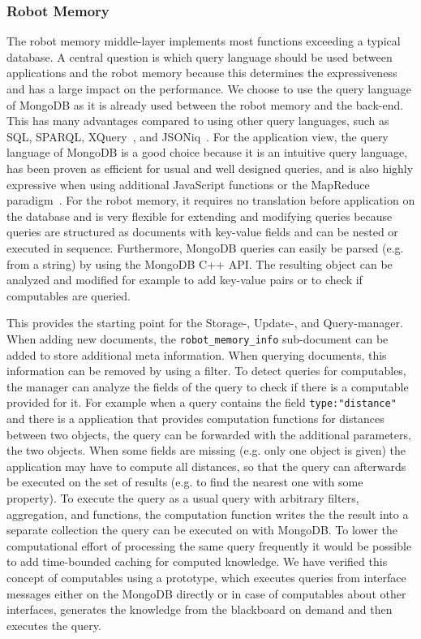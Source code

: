 \documentclass[a4paper,11pt]{article}
\begin{document}
\subsubsection{Robot Memory}
\label{sec:impl-memory}
The robot memory middle-layer implements most functions exceeding a
typical database.
A central question is which query language should be used between
applications and the robot memory because this determines the
expressiveness and has a large impact on the performance. We choose to
use the query language of MongoDB as it is already used between the
robot memory and the back-end. This has many advantages compared to
using other query languages, such as SQL, SPARQL,
XQuery~\cite{query-languages}, and JSONiq~\cite{jsoniq}.
%
For the application view, the query language of MongoDB is a good
choice because it is an intuitive query language, has been proven as
efficient for usual and well designed queries, and is also highly
expressive when using additional JavaScript functions or the MapReduce
paradigm~\cite{mongodb,RoboDB}. For the robot memory, it requires no
translation before application on the database and is very flexible
for extending and modifying queries because queries are structured as
documents with key-value fields and can be nested or executed in
sequence. Furthermore, MongoDB queries can easily be parsed (e.g. from
a string) by using the MongoDB C++ API. The resulting object can be
analyzed and modified for example to add key-value pairs or to check
if computables are queried.

This provides the starting point for the Storage-, Update-, and
Query-manager. When adding new documents, the
\texttt{robot\_memory\_info} sub-document can be added to store
additional meta information. When querying documents, this information
can be removed by using a filter. To detect queries for computables,
the manager can analyze the fields of the query to check if there is a
computable provided for it.  For example when a query contains the
field \texttt{type:"distance"} and there is a application that
provides computation functions for distances between two objects, the
query can be forwarded with the additional parameters, the two
objects.  When some fields are missing (e.g. only one object is given)
the application may have to compute all distances, so that the query
can afterwards be executed on the set of results (e.g. to find the
nearest one with some property). To execute the query as a usual query
with arbitrary filters, aggregation, and functions, the computation
function writes the the result into a separate collection the query
can be executed on with MongoDB. To lower the computational effort of
processing the same query frequently it would be possible to add
time-bounded caching for computed knowledge. We have verified this
concept of computables using a prototype, which executes queries from
interface messages either on the MongoDB directly or in case of
computables about other interfaces, generates the knowledge from the
blackboard on demand and then executes the query.
\end{document}
